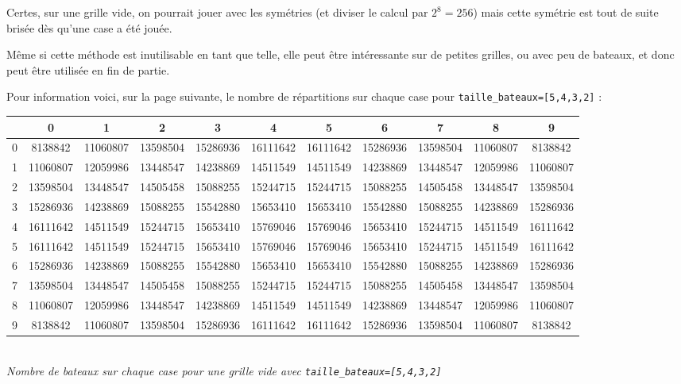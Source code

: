 Certes, sur une grille vide, on pourrait jouer avec les symétries (et diviser le calcul par $2^8=256$) mais cette symétrie est tout de suite brisée dès qu'une case a été jouée.

Même si cette méthode est inutilisable en tant que telle, elle peut être intéressante sur de petites grilles, ou avec peu de bateaux, et donc peut être utilisée en fin de partie.

Pour information voici, sur la page suivante, le nombre de répartitions sur chaque case pour \texttt{taille\_bateaux=[5,4,3,2]} :


\begin{landscape}
\vspace*{4cm}
\begin{center}
\begin{tabular}{|c|c|c|c|c|c|c|c|c|c|c|}
\hline
&0&1&2&3&4&5&6&7&8&9\\
\hline
0 & 8138842 & 11060807 & 13598504 & 15286936 & 16111642 & 16111642 & 15286936 & 13598504 & 11060807 & 8138842\\
\hline
1 & 11060807 & 12059986 & 13448547 & 14238869 & 14511549 & 14511549 & 14238869 & 13448547 & 12059986 & 11060807\\
\hline
2 & 13598504 & 13448547 & 14505458 & 15088255 & 15244715 & 15244715 & 15088255 & 14505458 & 13448547 & 13598504\\
\hline
3 & 15286936 & 14238869 & 15088255 & 15542880 & 15653410 & 15653410 & 15542880 & 15088255 & 14238869 & 15286936\\
\hline
4 & 16111642 & 14511549 & 15244715 & 15653410 & 15769046 & 15769046 & 15653410 & 15244715 & 14511549 & 16111642\\
\hline
5 & 16111642 & 14511549 & 15244715 & 15653410 & 15769046 & 15769046 & 15653410 & 15244715 & 14511549 & 16111642\\
\hline
6 & 15286936 & 14238869 & 15088255 & 15542880 & 15653410 & 15653410 & 15542880 & 15088255 & 14238869 & 15286936\\
\hline
7 & 13598504 & 13448547 & 14505458 & 15088255 & 15244715 & 15244715 & 15088255 & 14505458 & 13448547 & 13598504\\
\hline
8 & 11060807 & 12059986 & 13448547 & 14238869 & 14511549 & 14511549 & 14238869 & 13448547 & 12059986 & 11060807\\
\hline
9 & 8138842 & 11060807 & 13598504 & 15286936 & 16111642 & 16111642 & 15286936 & 13598504 & 11060807 & 8138842\\
\hline
\end{tabular}\\
\textit{Nombre de bateaux sur chaque case pour une grille vide avec \texttt{taille\_bateaux=[5,4,3,2]}}
\end{center}
\end{landscape}

